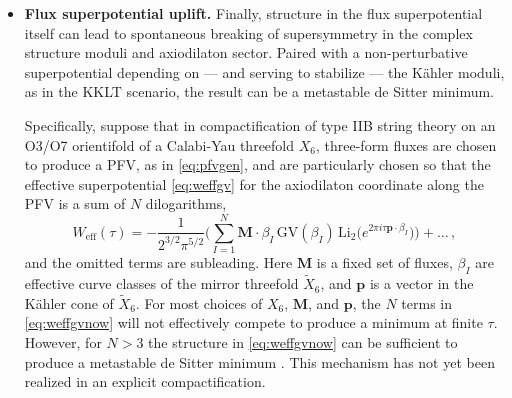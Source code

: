 \documentclass[12pt,a4wide]{article}
\begin{document}
\begin{itemize}
\item{\bf Flux superpotential uplift.} 
Finally, structure in the flux superpotential itself can lead to spontaneous breaking of supersymmetry in the complex structure moduli and axiodilaton sector.  Paired with a non-perturbative superpotential depending on --- and serving to stabilize --- the K\"ahler moduli, as in the KKLT scenario, the result can be a metastable de Sitter minimum.  

Specifically, suppose that in compactification of type IIB string theory on an O3/O7 orientifold of a Calabi-Yau threefold $X_6$, three-form fluxes are chosen to produce a PFV, as in \eqref{eq:pfvgen}, and are particularly chosen so that the effective superpotential \eqref{eq:weffgv} for the axiodilaton coordinate along the PFV is a sum of $N$
dilogarithms,
\begin{equation}\label{eq:weffgvnow}
     W_{\text{eff}}(\tau) = -\frac{1}{2^{3/2}\pi^{5/2}}\biggl( 
     \sum_{I=1}^{N} \mathbf{M}{\cdot}\beta_I\,\text{GV}(\beta_I)\,\text{Li}_2\bigl(e^{2\pi i \tau \mathbf{p}\cdot \beta_I} \bigr) \biggr)+\ldots \,,
\end{equation} 
and the omitted terms are subleading.
Here $\mathbf{M}$ is a fixed set of fluxes, $\beta_I$ are effective curve classes of the mirror threefold $\widetilde{X}_6$, and $\mathbf{p}$ is a vector in the K\"ahler cone of $\widetilde{X}_6$.
For most choices of $X_6$, $\mathbf{M}$, and $\mathbf{p}$, the $N$ terms in \eqref{eq:weffgvnow} will not effectively compete to produce a minimum at finite $\tau$.  However, for $N>3$ the structure in \eqref{eq:weffgvnow} can be sufficient to produce a metastable de Sitter minimum \cite{deSitterpaper}.
This mechanism has not yet been realized in an explicit compactification.



\end{itemize}
\end{document}
